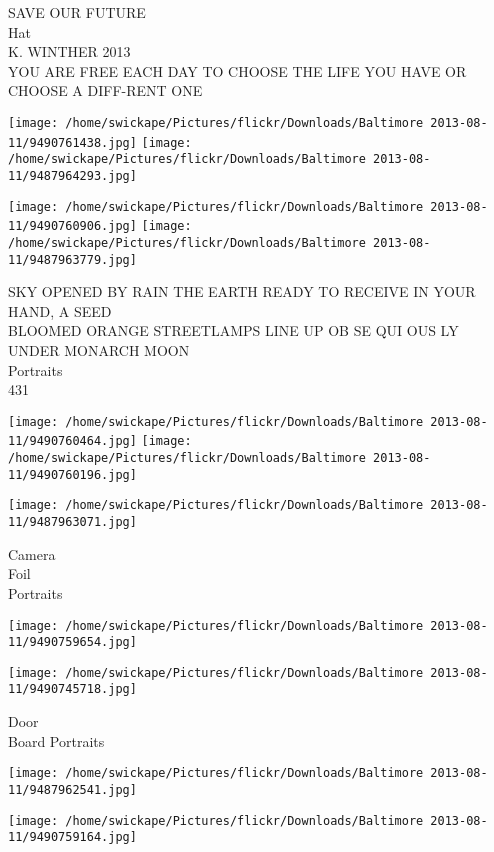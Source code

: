 \documentclass[10pt,letterpaper]{article}
\begin{document}
SAVE OUR FUTURE\\
Hat\\
K. WINTHER 2013\\
YOU ARE FREE EACH DAY TO CHOOSE THE LIFE YOU HAVE OR CHOOSE A DIFF{-}RENT ONE\\
\pagebreak

\texttt{[image: /home/swickape/Pictures/flickr/Downloads/Baltimore 2013-08-11/9490761438.jpg]}
\texttt{[image: /home/swickape/Pictures/flickr/Downloads/Baltimore 2013-08-11/9487964293.jpg]}

\texttt{[image: /home/swickape/Pictures/flickr/Downloads/Baltimore 2013-08-11/9490760906.jpg]}
\texttt{[image: /home/swickape/Pictures/flickr/Downloads/Baltimore 2013-08-11/9487963779.jpg]}

SKY OPENED BY RAIN THE EARTH READY TO RECEIVE IN YOUR HAND, A SEED\\
BLOOMED ORANGE STREETLAMPS LINE UP OB SE QUI OUS LY UNDER MONARCH MOON\\
Portraits\\
431\\
\pagebreak

\texttt{[image: /home/swickape/Pictures/flickr/Downloads/Baltimore 2013-08-11/9490760464.jpg]}
\texttt{[image: /home/swickape/Pictures/flickr/Downloads/Baltimore 2013-08-11/9490760196.jpg]}

\vspace{0.25in}
\texttt{[image: /home/swickape/Pictures/flickr/Downloads/Baltimore 2013-08-11/9487963071.jpg]}

Camera\\
Foil\\
Portraits\\
\pagebreak

\texttt{[image: /home/swickape/Pictures/flickr/Downloads/Baltimore 2013-08-11/9490759654.jpg]}

\vspace{0.25in}
\texttt{[image: /home/swickape/Pictures/flickr/Downloads/Baltimore 2013-08-11/9490745718.jpg]}

Door\\
Board Portraits\\
\pagebreak

\texttt{[image: /home/swickape/Pictures/flickr/Downloads/Baltimore 2013-08-11/9487962541.jpg]}

\vspace{0.25in}
\texttt{[image: /home/swickape/Pictures/flickr/Downloads/Baltimore 2013-08-11/9490759164.jpg]}
\end{document}
